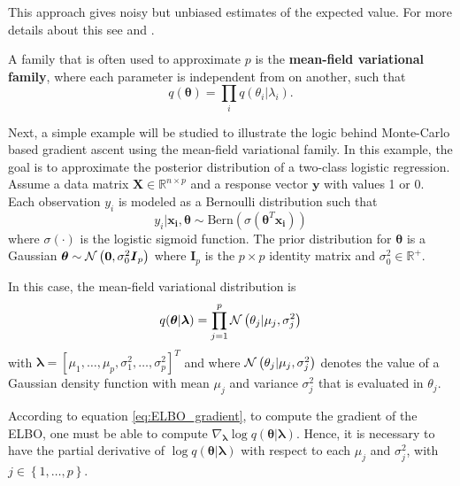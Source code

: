 This approach gives noisy but unbiased estimates of the expected value. For more details about this see \cite{kucukelbir2017automatic} and \cite{ranganath2014black}.

A family that is often used to approximate $p$ is the \textbf{mean-field variational family}, where each parameter is independent from on another, such that
\begin{equation}
  q(\boldsymbol{\theta}) = \prod_{i} q(\theta_i | \lambda_i).
\end{equation}


Next, a simple example will be studied to illustrate the logic behind Monte-Carlo based gradient ascent using the mean-field variational family. In this example, the goal is to approximate the posterior distribution of a two-class logistic regression. Assume a data matrix $\boldsymbol{X} \in \mathbb{R}^{n \times p}$ and a response vector $\boldsymbol{y}$ with values 1 or 0. Each observation $y_i$ is modeled as a Bernoulli distribution such that
\begin{equation}
  y_i | \boldsymbol{x_i}, \boldsymbol{\theta} \sim \mathrm{Bern}(\sigma(\boldsymbol{\theta}^T \boldsymbol{x_i}))
\end{equation}
where $\sigma(\cdot)$ is the logistic sigmoid function. The prior distribution for $\boldsymbol{\theta}$ is a Gaussian $\boldsymbol{\theta} \sim \mathcal{N}\left( \boldsymbol{0}, \sigma_0^2 \boldsymbol{I}_p \right)$ where $\boldsymbol{I}_p$ is the $p \times p$ identity matrix and $\sigma_0^2 \in \mathbb{R}^+$.

In this case, the mean-field variational distribution is
\begin{equation}
  \label{eq:mean_field_normal_prior}
  q(\boldsymbol{\theta} | \boldsymbol{\lambda}) = \prod_{j = 1}^p \mathcal{N}\left( \theta_j | \mu_j, \sigma_j^2 \right)
 \end{equation}
with $\boldsymbol{\lambda} = \left[ \mu_1, \hdots, \mu_p, \sigma_1^2, \hdots, \sigma_p^2 \right]^T$ and where $\mathcal{N}\left( \theta_j | \mu_j, \sigma_j^2 \right)$ denotes the value of a Gaussian density function with mean $\mu_j$ and variance $\sigma_j^2$ that is evaluated in $\theta_j$.

According to equation \eqref{eq:ELBO_gradient}, to compute the gradient of the ELBO, one must be able to compute $\nabla_{\boldsymbol{\lambda}} \log q(\boldsymbol{\theta} | \boldsymbol{\lambda})$. Hence, it is necessary to have the partial derivative of $\log q(\boldsymbol{\theta} | \boldsymbol{\lambda})$ with respect to each $\mu_j$ and $\sigma_j^2$, with $j \in \left\{ 1, \hdots, p \right\}$.

